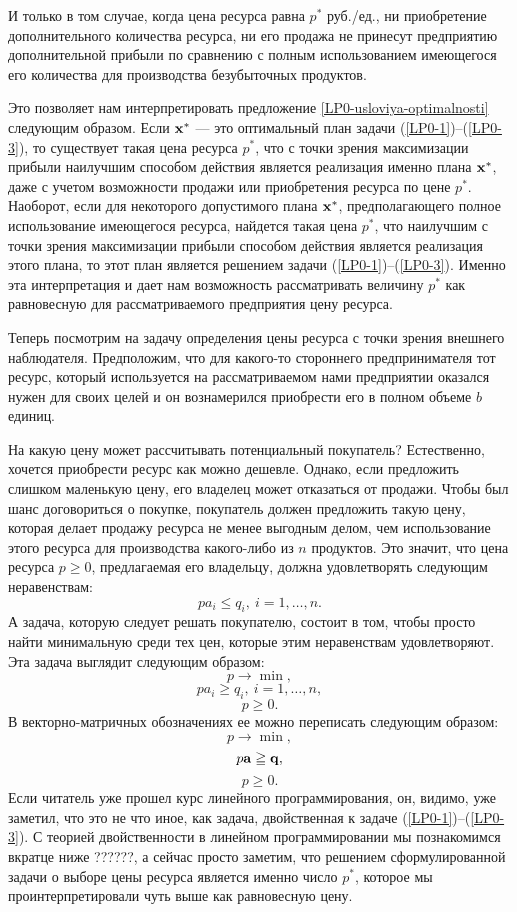     И только в том случае, когда цена ресурса равна $p^{*}$ руб./ед.,
    ни приобретение дополнительного количества ресурса, ни
    его продажа не принесут предприятию дополнительной прибыли по
    сравнению с полным использованием имеющегося его количества для
    производства безубыточных продуктов.

    Это позволяет нам  интерпретировать предложение
    \ref{LP0-usloviya-optimalnosti} следующим образом.
    Если $\mathbf{x^{*}}$ --- это оптимальный план задачи
    (\ref{LP0-1})--(\ref{LP0-3}), то существует такая цена
    ресурса $p^{*}$, что с точки зрения максимизации прибыли
    наилучшим способом действия является реализация именно плана
    $\mathbf{x^{*}}$, даже с учетом возможности продажи или приобретения
    ресурса по цене $p^{*}$. Наоборот, если для некоторого
    допустимого плана $\mathbf{x^{*}}$, предполагающего полное использование имеющегося ресурса,
    найдется такая цена $p^{*}$, что
    наилучшим с точки зрения максимизации прибыли способом действия
    является реализация этого плана, то этот план является
    решением задачи (\ref{LP0-1})--(\ref{LP0-3}).
    Именно эта интерпретация и дает нам возможность рассматривать величину $p^{*}$
    как равновесную для рассматриваемого предприятия цену ресурса.



    Теперь посмотрим на задачу определения цены ресурса с точки
    зрения внешнего наблюдателя. Предположим, что для какого-то
    стороннего предпринимателя тот ресурс, который используется на
    рассматриваемом нами предприятии оказался нужен для своих целей и он
    вознамерился приобрести его в полном объеме $b$ единиц.

    На какую цену может рассчитывать потенциальный покупатель?
    Естественно, хочется приобрести ресурс как можно дешевле. Однако,
    если предложить слишком маленькую цену, его владелец может
    отказаться от продажи. Чтобы был шанс договориться о покупке,
    покупатель должен предложить такую цену, которая делает продажу
    ресурса не менее выгодным делом, чем использование этого ресурса
    для производства какого-либо из $n$ продуктов. Это значит, что цена ресурса
    $p\geqslant0$, предлагаемая его владельцу,  должна удовлетворять
    следующим неравенствам:
    \[pa_{i}\leqslant q_{i}, \ i=1,\ldots,n.\]
    А задача, которую следует решать покупателю, состоит в том,
    чтобы просто найти минимальную среди тех цен, которые этим
    неравенствам удовлетворяют. Эта задача выглядит следующим
    образом:
    \[p\rightarrow\min,\]
   \[pa_{i}\geqslant q_{i}, \ i=1,\ldots,n,\]
   \[p\geqslant0.\]
   В векторно-матричных обозначениях ее можно переписать следующим
   образом:
   \[p\rightarrow\min,\]
   \[p\mathbf{a}\geqq\mathbf{q},\]
   \[p\geqslant0.\]
   Если читатель уже прошел курс линейного программирования, он,
   видимо, уже заметил, что это не что иное, как задача, двойственная к
   задаче (\ref{LP0-1})--(\ref{LP0-3}). С теорией двойственности в
   линейном программировании мы познакомимся вкратце  ниже
   ??????, а сейчас просто заметим, что решением
   сформулированной задачи о выборе цены ресурса является именно
   число $p^{*}$, которое мы проинтерпретировали чуть выше как
   равновесную цену.

